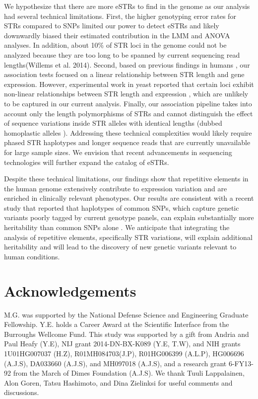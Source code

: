 We hypothesize that there are more eSTRs to find in the genome as our analysis had several technical limitations. First, the higher genotyping error rates for STRs compared to SNPs limited our power to detect eSTRs and likely downwardly biased their estimated contribution in the LMM and ANOVA analyses. In addition, about 10\% of STR loci in the genome could not be analyzed because they are too long to be spanned by current sequencing read lengths(Willems et al. 2014). Second, based on previous findings in humans \cite{GebhardtZankerBrandt1999,ShimajiriArimaTanimotoEtAl1999,ContenteDittmerKochEtAl2002}, our association tests focused on a linear relationship between STR length and gene expression. However, experimental work in yeast reported that certain loci exhibit non-linear relationships between STR length and expression \cite{VincesLegendreCaldaraEtAl2009}, which are unlikely to be captured in our current analysis. Finally, our association pipeline takes into account only the length polymorphisms of STRs and cannot distinguish the effect of sequence variations inside STR alleles with identical lengths (dubbed homoplastic alleles \cite{WeberBroman2001}). Addressing these technical complexities would likely require phased STR haplotypes and longer sequence reads that are currently unavailable for large sample sizes. We envision that recent advancements in sequencing technologies \cite{ChaissonHuddlestonDennisEtAl2015} will further expand the catalog of eSTRs.  

Despite these technical limitations, our findings show that repetitive elements in the human genome extensively contribute to expression variation and are enriched in clinically relevant phenotypes. Our results are consistent with a recent study that reported that haplotypes of common SNPs, which capture genetic variants poorly tagged by current genotype panels, can explain substantially more heritability than common SNPs alone \cite{BhatiaGusevLohEtAl2015}. We anticipate that integrating the analysis of repetitive elements, specifically STR variations, will explain additional heritability and will lead to the discovery of new genetic variants relevant to human conditions.

\section{Acknowledgements}
M.G. was supported by the National Defense Science and Engineering Graduate Fellowship. Y.E. holds a Career Award at the Scientific Interface from the Burroughs Wellcome Fund. This study was supported by a gift from Andria and Paul Heafy (Y.E), NIJ grant 2014-DN-BX-K089 (Y.E, T.W), and NIH grants 1U01HG007037 (H.Z), R01MH084703(J.P), R01HG006399 (A.L.P), HG006696 (A.J.S), DA033660 (A.J.S), and MH097018 (A.J.S), and a research grant 6-FY13-92 from the March of Dimes Foundation (A.J.S). We thank Tuuli Lappalainen, Alon Goren, Tatsu Hashimoto, and Dina Zielinksi for useful comments and discussions.

